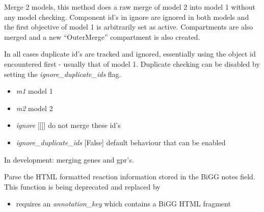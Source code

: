 \documentclass[a4paper,11pt,english]{sphinxmanual}
\begin{document}
\begin{fulllineitems}
\label{modules_doc:cbmpy.CBTools.merge2Models}
Merge 2 models, this method does a raw merge of model 2 into model 1 without any model checking.
Component id's in ignore are ignored in both models and the first objective of model 1 is arbitrarily
set as active. Compartments are also merged and a new ``OuterMerge'' compartment is also created.

In all cases duplicate id's are tracked and ignored, essentially using the object id encountered first -
usually that of model 1. Duplicate checking can be disabled by setting the \emph{ignore\_duplicate\_ids} flag.
\begin{itemize}
\item {} 
\emph{m1} model 1

\item {} 
\emph{m2} model 2

\item {} 
\emph{ignore} {[}{[}{]}{]} do not merge these id's

\item {} 
\emph{ignore\_duplicate\_ids} {[}False{]} default behaviour that can be enabled

\end{itemize}

In development: merging genes and gpr's.

\end{fulllineitems}


\begin{fulllineitems}
\label{modules_doc:cbmpy.CBTools.processBiGGannotationNote}
Parse the HTML formatted reaction information stored in the BiGG notes field.
This function is being deprecated and replaced by 
\begin{itemize}
\item {} 
requires an \emph{annotation\_key} which contains a BiGG HTML fragment

\end{itemize}

\end{fulllineitems}
\end{document}

